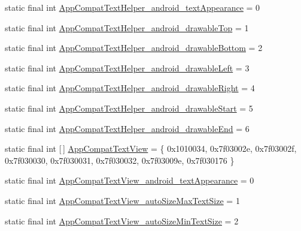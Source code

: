 \begin{DoxyCompactItemize}
\item 
static final int \mbox{\hyperlink{classandroid_1_1support_1_1v7_1_1appcompat_1_1_r_1_1styleable_a814e95f4f2dd374d2a695e80970efd8f}{App\+Compat\+Text\+Helper\+\_\+android\+\_\+text\+Appearance}} = 0
\item 
static final int \mbox{\hyperlink{classandroid_1_1support_1_1v7_1_1appcompat_1_1_r_1_1styleable_abe33b365b60b05e2e03d01f4b7a20d9d}{App\+Compat\+Text\+Helper\+\_\+android\+\_\+drawable\+Top}} = 1
\item 
static final int \mbox{\hyperlink{classandroid_1_1support_1_1v7_1_1appcompat_1_1_r_1_1styleable_a4c96d9f5e48f70aa3d029ea24de764e0}{App\+Compat\+Text\+Helper\+\_\+android\+\_\+drawable\+Bottom}} = 2
\item 
static final int \mbox{\hyperlink{classandroid_1_1support_1_1v7_1_1appcompat_1_1_r_1_1styleable_ac4d5f0c9720fa98bb896d20a382c6a69}{App\+Compat\+Text\+Helper\+\_\+android\+\_\+drawable\+Left}} = 3
\item 
static final int \mbox{\hyperlink{classandroid_1_1support_1_1v7_1_1appcompat_1_1_r_1_1styleable_af41cfde8b06ee8402af254dc89615611}{App\+Compat\+Text\+Helper\+\_\+android\+\_\+drawable\+Right}} = 4
\item 
static final int \mbox{\hyperlink{classandroid_1_1support_1_1v7_1_1appcompat_1_1_r_1_1styleable_a7d656f49d67140afb26bed6f6a27b67a}{App\+Compat\+Text\+Helper\+\_\+android\+\_\+drawable\+Start}} = 5
\item 
static final int \mbox{\hyperlink{classandroid_1_1support_1_1v7_1_1appcompat_1_1_r_1_1styleable_a6dc62e88b84309ee235bd27214790683}{App\+Compat\+Text\+Helper\+\_\+android\+\_\+drawable\+End}} = 6
\item 
static final int \mbox{[}$\,$\mbox{]} \mbox{\hyperlink{classandroid_1_1support_1_1v7_1_1appcompat_1_1_r_1_1styleable_a87384e67b6e421e7c07536d9afe8d185}{App\+Compat\+Text\+View}} = \{ 0x1010034, 0x7f03002e, 0x7f03002f, 0x7f030030, 0x7f030031, 0x7f030032, 0x7f03009e, 0x7f030176 \}
\item 
static final int \mbox{\hyperlink{classandroid_1_1support_1_1v7_1_1appcompat_1_1_r_1_1styleable_a3ce93dcbd8fd4d957a09de9dde780dca}{App\+Compat\+Text\+View\+\_\+android\+\_\+text\+Appearance}} = 0
\item 
static final int \mbox{\hyperlink{classandroid_1_1support_1_1v7_1_1appcompat_1_1_r_1_1styleable_ab425aaab70802b2f1d56e5ffa1239b97}{App\+Compat\+Text\+View\+\_\+auto\+Size\+Max\+Text\+Size}} = 1
\item 
static final int \mbox{\hyperlink{classandroid_1_1support_1_1v7_1_1appcompat_1_1_r_1_1styleable_a4cdcfd0ade1b03a2e00ff87794215b64}{App\+Compat\+Text\+View\+\_\+auto\+Size\+Min\+Text\+Size}} = 2

\end{DoxyCompactItemize}
